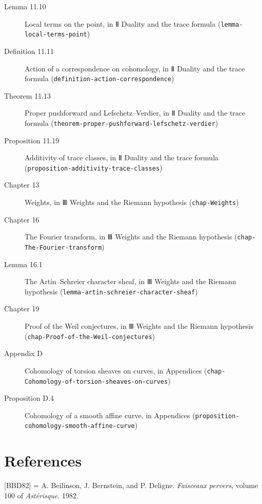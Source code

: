 \documentclass[11pt]{article}
\newcommand{\bpslug}[1]{\texttt{#1}}
\newcommand{\bpbibitem}[3]{\par\setbox0\hbox{[#1]\enspace}\ifdim\wd0<5em\setbox0\hbox to 5em{[#1]\hfil}\fi
  \hangindent=\wd0 \hangafter=1 \noindent\box0\phantomsection\label{#2}#3\par\smallskip}
\begin{document}
\begin{description}
\item[Lemma 11.10] Local terms on the point, in Ⅱ Duality and the trace formula (\bpslug{lemma-{}\allowbreak{}local-{}\allowbreak{}terms-{}\allowbreak{}point})
\item[Definition 11.11] Action of a correspondence on cohomology, in Ⅱ Duality and the trace formula (\bpslug{definition-{}\allowbreak{}action-{}\allowbreak{}correspondence})
\item[Theorem 11.13] Proper pushforward and Lefschetz–Verdier, in Ⅱ Duality and the trace formula (\bpslug{theorem-{}\allowbreak{}proper-{}\allowbreak{}pushforward-{}\allowbreak{}lefschetz-{}\allowbreak{}verdier})
\item[Proposition 11.19] Additivity of trace classes, in Ⅱ Duality and the trace formula (\bpslug{proposition-{}\allowbreak{}additivity-{}\allowbreak{}trace-{}\allowbreak{}classes})
\item[Chapter 13] Weights, in Ⅲ Weights and the Riemann hypothesis (\bpslug{chap-{}\allowbreak{}Weights})
\item[Chapter 16] The Fourier transform, in Ⅲ Weights and the Riemann hypothesis (\bpslug{chap-{}\allowbreak{}The-{}\allowbreak{}Fourier-{}\allowbreak{}transform})
\item[Lemma 16.1] The Artin–Schreier character sheaf, in Ⅲ Weights and the Riemann hypothesis (\bpslug{lemma-{}\allowbreak{}artin-{}\allowbreak{}schreier-{}\allowbreak{}character-{}\allowbreak{}sheaf})
\item[Chapter 19] Proof of the Weil conjectures, in Ⅲ Weights and the Riemann hypothesis (\bpslug{chap-{}\allowbreak{}Proof-{}\allowbreak{}of-{}\allowbreak{}the-{}\allowbreak{}Weil-{}\allowbreak{}conjectures})
\item[Appendix D] Cohomology of torsion sheaves on curves, in Appendices (\bpslug{chap-{}\allowbreak{}Cohomology-{}\allowbreak{}of-{}\allowbreak{}torsion-{}\allowbreak{}sheaves-{}\allowbreak{}on-{}\allowbreak{}curves})
\item[Proposition D.4] Cohomology of a smooth affine curve, in Appendices (\bpslug{proposition-{}\allowbreak{}cohomology-{}\allowbreak{}smooth-{}\allowbreak{}affine-{}\allowbreak{}curve})
\end{description}
\clearpage{}%
\section*{References}
\bpbibitem{BBD82}{bp107}{A. Beilinson, J. Bernstein, and P. Deligne. \emph{Faisceaux pervers}, volume 100 of \emph{Astérisque}. 1982.}
\end{document}
